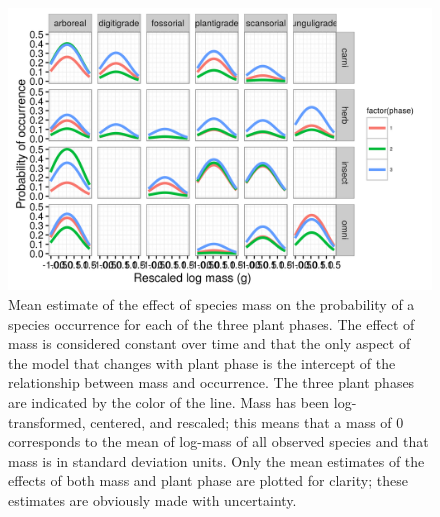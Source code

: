 \documentclass[12pt,letterpaper]{article}
\begin{document}
\begin{figure}[ht]
  \centering
  \includegraphics[width=\textwidth,height=0.4\textheight,keepaspectratio=true]{figure/mass_on_pres}
  \caption[Effect of mass on probability of species occurrence as estimated from the pure-presence model]{Mean estimate of the effect of species mass on the probability of a species occurrence for each of the three plant phases. The effect of mass is considered constant over time and that the only aspect of the model that changes with plant phase is the intercept of the relationship between mass and occurrence. The three plant phases are indicated by the color of the line. Mass has been log-transformed, centered, and rescaled; this means that a mass of 0 corresponds to the mean of log-mass of all observed species and that mass is in standard deviation units. Only the mean estimates of the effects of both mass and plant phase are plotted for clarity; these estimates are obviously made with uncertainty.}
  \label{fig:mass_occur}
\end{figure}
\end{document}

